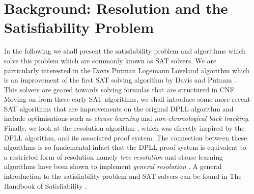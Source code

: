 \chapter{Background: Resolution and the Satisfiability Problem}
In the following we shall present the satisfiability problem and  algorithms which solve this problem which are commonly known as SAT solvers. We are particularly interested in the Davis Putman Logemann Loveland algorithm \cite{DPLL} which is an improvement of the first SAT solving algorithm by Davis and Putnam \cite{MD60}. This solvers are geared towards solving formulas that are structured in CNF Moving on from these early SAT algorithms, we shall introduce some more recent SAT algorithms that are improvements on the original DPLL algorithm and include optimisations such as \emph{clause learning} and \emph{non-chronological back tracking}. Finally, we look at the resolution algorithm \cite{JR65}, which was directly inspired by the DPLL algorithm, and its associated proof system. The connection between these algorithms is so fundemental infact that the DPLL proof system is equivalent to a restricted form of resolution namely \emph{tree resolution} \cite{} and clause learning algorithms have been shown to implement \emph{general resolution} \cite{}. A general introduction to the satisfiability problem and SAT solvers can be found in The Handbook of Satisfiability \cite{}.


